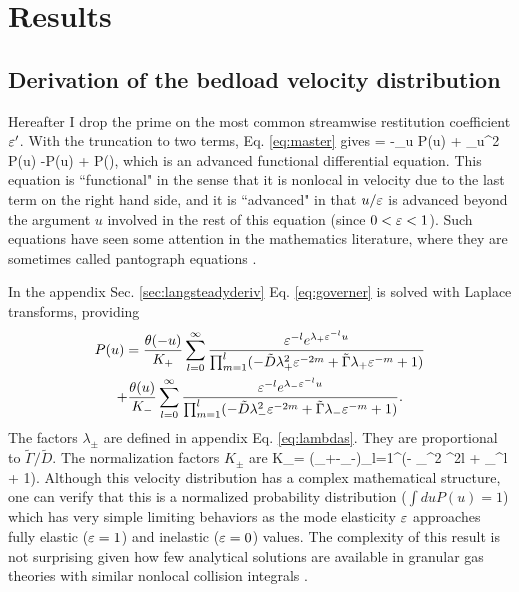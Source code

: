 \section{Results}
\label{sec:langresults}

\subsection{Derivation of the bedload velocity distribution}
\label{sec:langsolution}
Hereafter I drop the prime on the most common streamwise restitution coefficient $\varepsilon'$.
With the truncation to two terms, Eq. \ref{eq:master} gives 
 = -\tilde{\Gamma}\partial_u P(u) + \partial_u^2 P(u) -P(u) +  P\big(\big),\label{eq:governer} \ee
which is an advanced functional differential equation. This equation is ``functional" in the sense that it is nonlocal in velocity due to the last term on the right hand side, and it is ``advanced" in that $u/\varepsilon$ is advanced beyond the argument $u$ involved in the rest of this equation (since $0<\varepsilon<1$).
Such equations have seen some attention in the mathematics literature, where they are sometimes called pantograph equations \citep{Hall1989, Kim1998,Zaidi2015}.

In the appendix Sec. \ref{sec:langsteadyderiv} Eq. \ref{eq:governer} is solved with Laplace transforms, providing
\begin{multline} P(u) = \frac{\theta(-u)}{K_+}\sum_{l=0}^\infty \frac{\varepsilon^{-l}e^{\lambda_+\varepsilon^{-l}u}}{\prod_{m=1}^l(-\tilde{D} \lambda_+^2 \varepsilon^{-2m} + \tilde{\Gamma} \lambda_+ \varepsilon^{-m} + 1) } 
	\\+ \frac{\theta(u)}{K_-}\sum_{l=0}^\infty \frac{\varepsilon^{-l}e^{\lambda_-\varepsilon^{-l}u}}{\prod_{m=1}^l(- \tilde{D} \lambda_-^2 \varepsilon^{-2m} + \tilde{\Gamma} \lambda_- \varepsilon^{-m} + 1) } \label{eq:steadystate}. \end{multline}
The factors $\lambda_\pm$ are defined in appendix Eq. \ref{eq:lambdas}. They are proportional to $\tilde{\Gamma}/\tilde{D}$. 
The normalization factors $K_\pm$ are 
\be K_\pm = (\lambda_+-\lambda_-)\prod_{l=1}^\infty (- \lambda_\pm^2 \ve^{2l} +\tilde{\Gamma} \lambda_\pm \ve^{l} + 1). \ee
Although this velocity distribution has a complex mathematical structure, one can verify that this is a normalized probability distribution ($\int du P(u) = 1$) which has very simple limiting behaviors as the mode elasticity $\varepsilon$ approaches fully elastic ($\varepsilon=1$) and inelastic ($\varepsilon = 0$) values. The complexity of this result is not surprising given how few analytical solutions are available in granular gas theories with similar nonlocal collision integrals \citep[e.g.][]{Brilliantov2004}.

